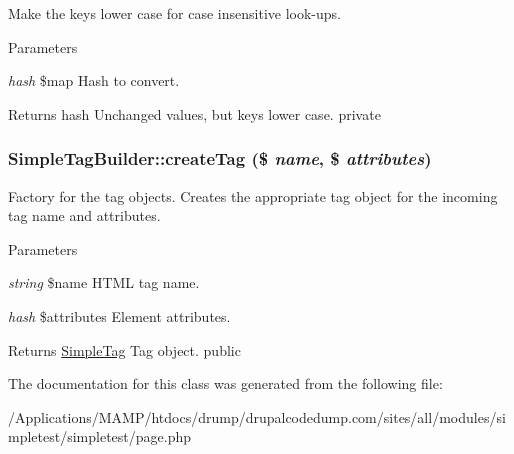 \label{class_simple_tag_builder_af948b060e63eff87637beb993b35f072}
Make the keys lower case for case insensitive look-\/ups. 
\begin{DoxyParams}{Parameters}
\item[{\em hash}]\$map Hash to convert. \end{DoxyParams}
\begin{DoxyReturn}{Returns}
hash Unchanged values, but keys lower case.  private 
\end{DoxyReturn}
\hypertarget{class_simple_tag_builder_a21fd84e5f34b51890d72d8a66d96fbf3}{
\subsubsection[{createTag}]{\setlength{\rightskip}{0pt plus 5cm}SimpleTagBuilder::createTag (\$ {\em name}, \/  \$ {\em attributes})}}
\label{class_simple_tag_builder_a21fd84e5f34b51890d72d8a66d96fbf3}
Factory for the tag objects. Creates the appropriate tag object for the incoming tag name and attributes. 
\begin{DoxyParams}{Parameters}
\item[{\em string}]\$name HTML tag name. \item[{\em hash}]\$attributes Element attributes. \end{DoxyParams}
\begin{DoxyReturn}{Returns}
\hyperlink{class_simple_tag}{SimpleTag} Tag object.  public 
\end{DoxyReturn}


The documentation for this class was generated from the following file:\begin{DoxyCompactItemize}
\item 
/Applications/MAMP/htdocs/drump/drupalcodedump.com/sites/all/modules/simpletest/simpletest/page.php\end{DoxyCompactItemize}
